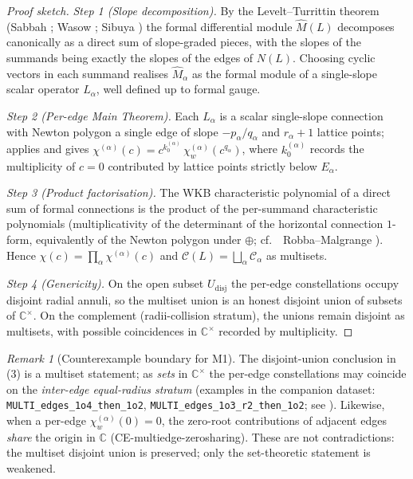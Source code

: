 \documentclass[11pt,a4paper]{article}
\theoremstyle{plain}
\theoremstyle{definition}
\theoremstyle{remark}
\newtheorem{remark}[theorem]{Remark}
\newcommand{\NL}{N(L)}
\newcommand{\Cl}{\mathcal{C}}
\newcommand{\cf}{cf.\ }
\begin{document}
\begin{proof}[Proof sketch]
\textit{Step 1 (Slope decomposition).} By the Levelt--Turrittin theorem
(Sabbah \cite[Ch.~II]{sabbah-isomon}; Wasow \cite[Ch.~VII]{wasow};
Sibuya \cite{sibuya}) the formal differential module $\widehat{M}(L)$
decomposes canonically as a direct sum of slope-graded pieces, with the
slopes of the summands being exactly the slopes of the edges of $\NL$.
Choosing cyclic vectors in each summand realises $\widehat{M}_\alpha$ as
the formal module of a single-slope scalar operator $L_\alpha$, well
defined up to formal gauge.

\textit{Step 2 (Per-edge Main Theorem).} Each $L_\alpha$ is a scalar
single-slope connection with Newton polygon a single edge of slope
$-p_\alpha / q_\alpha$ and $r_\alpha + 1$ lattice points; 
applies and gives
$\chi^{(\alpha)}(c) = c^{k_0^{(\alpha)}}\, \chi_w^{(\alpha)}(c^{q_\alpha})$,
where $k_0^{(\alpha)}$ records the multiplicity of $c = 0$ contributed by
lattice points strictly below $E_\alpha$.

\textit{Step 3 (Product factorisation).} The WKB characteristic polynomial
of a direct sum of formal connections is the product of the per-summand
characteristic polynomials (multiplicativity of the determinant of the
horizontal connection $1$-form, equivalently of the Newton polygon under
$\oplus$; \cf\ Robba--Malgrange \cite{robba-malgrange}). Hence
$\chi(c) = \prod_\alpha \chi^{(\alpha)}(c)$ and $\Cl(L) = \bigsqcup_\alpha
\Cl_\alpha$ as multisets.

\textit{Step 4 (Genericity).} On the open subset $U_{\mathrm{disj}}$ the
per-edge constellations occupy disjoint radial annuli, so the multiset
union is an honest disjoint union of subsets of $\mathbb{C}^\times$. On
the complement (radii-collision stratum), the unions remain disjoint as
multisets, with possible coincidences in $\mathbb{C}^\times$ recorded by
multiplicity. \qedhere
\end{proof}

\begin{remark}[Counterexample boundary for M1]\label{rem:M1-counter}
The disjoint-union conclusion in (3) is a multiset statement; as
\emph{sets} in $\mathbb{C}^\times$ the per-edge constellations may
coincide on the \emph{inter-edge equal-radius stratum} (examples in the
companion dataset: \texttt{MULTI\_edges\_1o4\_then\_1o2},
\texttt{MULTI\_edges\_1o3\_r2\_then\_1o2}; see
\cite[counterexamples.json: CE-multiedge-equalradius]{wkb_dataset_v1}).
Likewise, when a per-edge $\chi_w^{(\alpha)}(0) = 0$, the zero-root
contributions of adjacent edges \emph{share} the origin in $\mathbb{C}$
(CE-multiedge-zerosharing). These are not contradictions: the multiset
disjoint union is preserved; only the set-theoretic statement is
weakened.
\end{remark}
\end{document}
